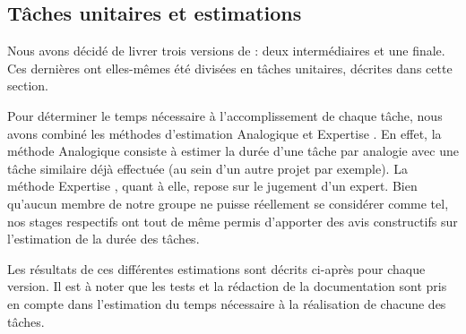 	\subsection{Tâches unitaires et estimations}
		\label{subsec:taches_unitaires}

	Nous avons décidé de livrer trois versions de \glasir{} : deux intermédiaires et une finale. Ces dernières ont elles-mêmes été divisées en tâches unitaires, décrites dans cette section.
	
	Pour déterminer le temps nécessaire à l'accomplissement de chaque tâche, nous avons combiné les méthodes d’estimation \og Analogique \fg{} et \og Expertise \fg{}. En effet, la méthode \og Analogique \fg{} consiste à estimer la durée d'une tâche par analogie avec une tâche similaire déjà effectuée (au sein d'un autre projet par exemple). La méthode \og Expertise \fg{}, quant à elle, repose sur le jugement d'un expert. Bien qu'aucun membre de notre groupe ne puisse réellement se considérer comme tel, nos stages respectifs ont tout de même permis d'apporter des avis constructifs sur l'estimation de la durée des tâches.
	
	Les résultats de ces différentes estimations sont décrits ci-après pour chaque version. Il est à noter que les tests et la rédaction de la documentation sont pris en compte dans l'estimation du temps nécessaire à la réalisation de chacune des tâches.
	

